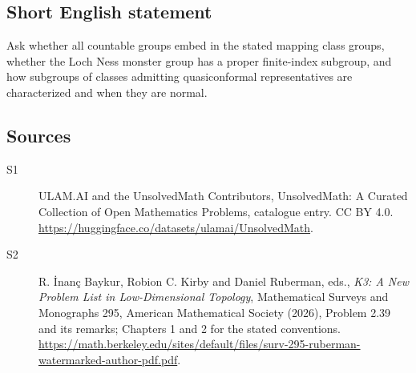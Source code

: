 \documentclass[11pt]{article}
\begin{document}
\subsection{Short English statement}
Ask whether all countable groups embed in the stated mapping class groups, whether the Loch Ness monster group has a proper finite-index subgroup, and how subgroups of classes admitting quasiconformal representatives are characterized and when they are normal.
\subsection{Sources}
\begin{description}
\item[\hypertarget{source:statement:1}{S1}] ULAM.AI and the UnsolvedMath Contributors, UnsolvedMath: A Curated Collection of Open Mathematics Problems, catalogue entry. CC BY 4.0. \url{https://huggingface.co/datasets/ulamai/UnsolvedMath}.
\item[\hypertarget{source:statement:2}{S2}] R. İnanç Baykur, Robion C. Kirby and Daniel Ruberman, eds., \emph{K3: A New Problem List in Low-Dimensional Topology}, Mathematical Surveys and Monographs 295, American Mathematical Society (2026), Problem 2.39 and its remarks; Chapters 1 and 2 for the stated conventions. \url{https://math.berkeley.edu/sites/default/files/surv-295-ruberman-watermarked-author-pdf.pdf}.
\end{description}
\label{end:statement}
\end{document}

